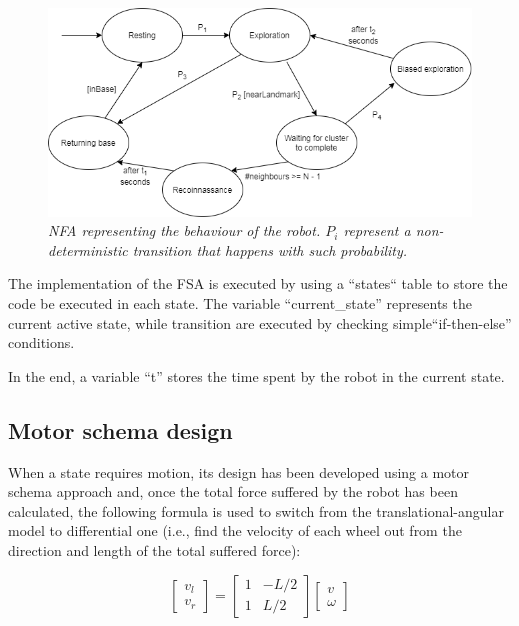 \begin{figure}[H]
\centering
\includegraphics[width=\linewidth]{images/NFA.png}
\caption{\textit{NFA representing the behaviour of the robot. $P_i$ represent a non-deterministic transition that happens with such probability.}}
\label{fig:NFA}
\end{figure}

The implementation of the FSA is executed by using a ``states`` table to store the code be executed in each state. The variable ``current\_state'' represents the current active state, while transition are executed by checking simple``if-then-else'' conditions.

\noindent
In the end, a variable ``t'' stores the time spent by the robot in the current state.

\subsection{Motor schema design}

When a state requires motion, its design has been developed using a motor schema approach and, once the total force suffered by the robot has been calculated, the following formula is used to switch from the translational-angular model to differential one (i.e., find the velocity of each wheel out from the direction and length of the total suffered force):    

\begin{equation}
\begin{bmatrix} 
v_l \\
v_r
\end{bmatrix}
=
\begin{bmatrix} 
1 & -L/2 \\
1 & L/2
\end{bmatrix}
\begin{bmatrix} 
v \\
\omega
\end{bmatrix}
\tag{3.0}\label{eq:3.0}
\end{equation}

